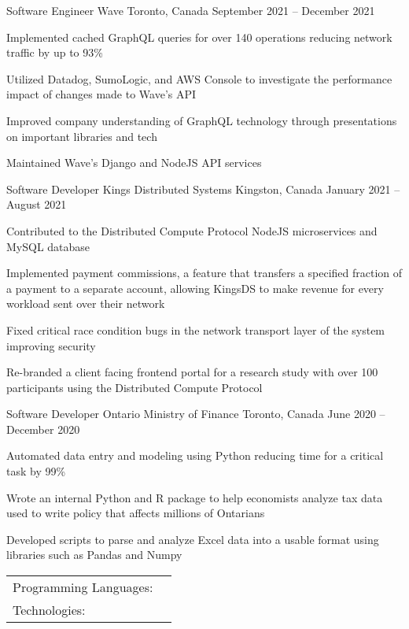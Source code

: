 \documentclass[]{awesome-cv}
\begin{document}
\vspace{-2mm}
\begin{cventries}
	\cventry
	{Software Engineer}
	{Wave}
	{Toronto, Canada}
	{September 2021 – December 2021}
	{\begin{cvitems}
		\item {Implemented cached GraphQL queries for over 140 operations reducing network traffic by up to 93\%}
    \item {Utilized Datadog, SumoLogic, and AWS Console to investigate the performance impact of changes made to Wave's API}
    \item {Improved company understanding of GraphQL technology through presentations on important libraries and tech}
    \item {Maintained Wave's Django and NodeJS API services}
		\end{cvitems}}
  \cventry
	{Software Developer}
	{Kings Distributed Systems}
	{Kingston, Canada}
	{January 2021 – August 2021}
	{\begin{cvitems}
    \item {Contributed to the Distributed Compute Protocol NodeJS microservices and MySQL database}
		\item {Implemented payment commissions, a feature that transfers a specified fraction of a payment to a separate account, allowing KingsDS to make revenue for every workload sent over their network}
		\item {Fixed critical race condition bugs in the network transport layer of the system improving security}
		\item {Re-branded a client facing frontend portal for a research study with over 100 participants using the Distributed Compute Protocol}
		\end{cvitems}}
	\cventry
	{Software Developer}
	{Ontario Ministry of Finance}
	{Toronto, Canada}
	{June 2020 – December 2020}
	{\begin{cvitems}
		\item {Automated data entry and modeling using Python reducing time for a critical task by 99\%}
		\item {Wrote an internal Python and R package to help economists analyze tax data used to write policy that affects millions of Ontarians}
		\item {Developed scripts to parse and analyze Excel data into a usable format using libraries such as Pandas and Numpy}
		\end{cvitems}}
\end{cventries}
\begin{cventries}
	\cventry
	{}
	{\def\arraystretch{1.15}{\begin{tabular}{ l l }
		Programming Languages:  & {\skill{ JavaScript, C, Shell / Bash, Python, Kotlin, Java, SQL, R, Perl}} \\
		Technologies:  & {\skill{ Node.js, Linux, Android Studio, GraphQL, AWS, Datadog, Express.js, Tensorflow}} \\
		\end{tabular}}}
	{}
	{}
	{}
\end{cventries}
\end{document}
